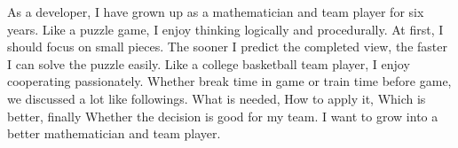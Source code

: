 

\begin{cvparagraph}

As a developer, I have grown up as a mathematician and team player for six years.
Like a puzzle game, I enjoy thinking logically and procedurally.
At first, I should focus on small pieces.
The sooner I predict the completed view, the faster I can solve the puzzle easily.
Like a college basketball team player, I enjoy cooperating passionately.
Whether break time in game or train time before game, we discussed a lot like followings.
What is needed, How to apply it, Which is better, finally Whether the decision is good for my team.
I want to grow into a better mathematician and team player.
\end{cvparagraph}
